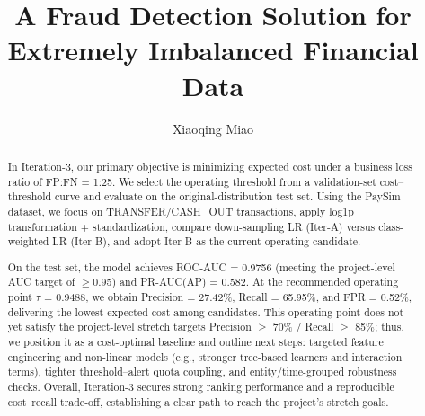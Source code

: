 \documentclass[sigplan,screen]{acmart}
\begin{document}
\title[Data Mining]{ A Fraud Detection Solution for Extremely Imbalanced Financial Data}

\author{Xiaoqing Miao}


\renewcommand{\shortauthors}{Xiaoqing Miao}

\begin{abstract}
\sloppy
In Iteration-3, our primary objective is minimizing expected cost under a business loss ratio of FP:FN = 1:25. We select the operating threshold from a validation-set cost--threshold curve and evaluate on the original-distribution test set. Using the PaySim dataset, we focus on TRANSFER/CASH\_OUT transactions, apply log1p transformation + standardization, compare down-sampling LR (Iter-A) versus class-weighted LR (Iter-B), and adopt Iter-B as the current operating candidate.

On the test set, the model achieves ROC-AUC = 0.9756 (meeting the project-level AUC target of $\geq$0.95) and PR-AUC(AP) = 0.582. At the recommended operating point $\tau$ = 0.9488, we obtain Precision = 27.42\%, Recall = 65.95\%, and FPR = 0.52\%, delivering the lowest expected cost among candidates. This operating point does not yet satisfy the project-level stretch targets Precision $\geq$ 70\% / Recall $\geq$ 85\%; thus, we position it as a cost-optimal baseline and outline next steps: targeted feature engineering and non-linear models (e.g., stronger tree-based learners and interaction terms), tighter threshold--alert quota coupling, and entity/time-grouped robustness checks. Overall, Iteration-3 secures strong ranking performance and a reproducible cost--recall trade-off, establishing a clear path to reach the project's stretch goals.
\fussy
\end{abstract}


\end{document}
